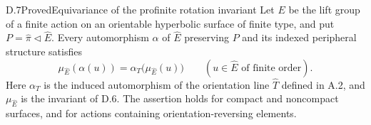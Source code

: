\begin{claim}{D.7}{Proved}{Equivariance of the profinite rotation invariant}
Let $E$ be the lift group of a finite action on an orientable hyperbolic
surface of finite type, and put $P=\widehat\pi\triangleleft\widehat E$.
Every automorphism $\alpha$ of $\widehat E$ preserving $P$ and its indexed
peripheral structure satisfies
\[
 \mu_{\widehat E}(\alpha(u))=\alpha_T\bigl(\mu_{\widehat E}(u)\bigr)
 \qquad (u\in\widehat E\text{ of finite order}).
\]
Here $\alpha_T$ is the induced automorphism of the orientation line
$\widehat T$ defined in A.2, and $\mu_{\widehat E}$ is the invariant of
D.6.  The assertion holds for compact and noncompact surfaces, and for
actions containing orientation-reversing elements.
\end{claim}
